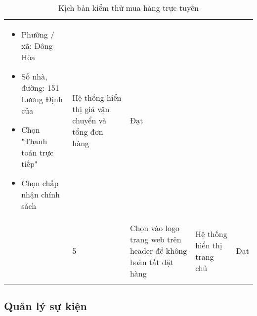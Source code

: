 {\begin{longtable}{| p{2.5cm}| p{1cm}| p{5.5cm}| p{4.5cm} | p{1.5cm} |}
\begin{itemize}
            \item Phường / xã: Đông Hòa
            \item Số nhà, đường: 151 Lương Định của
            \item Chọn "Thanh toán trực tiếp"
            \item Chọn chấp nhận chính sách
        \end{itemize}
                                                                                                        &
        Hệ thống hiển thị giá vận chuyển và tổng đơn hàng                                               &
        Đạt                                                                                                                                                                                            \\
        \cline{2-5}
                                                                                                        & 5                  &
        Chọn vào logo trang web trên header để không hoàn tất đặt hàng                                  &
        Hệ thống hiển thị trang chủ                                                                     &
        Đạt                                                                                                                                                                                            \\
        \hline
        \caption{Kịch bản kiểm thử mua hàng trực tuyến}
    \end{longtable}
}

\newpage

\subsection{Quản lý sự kiện}

